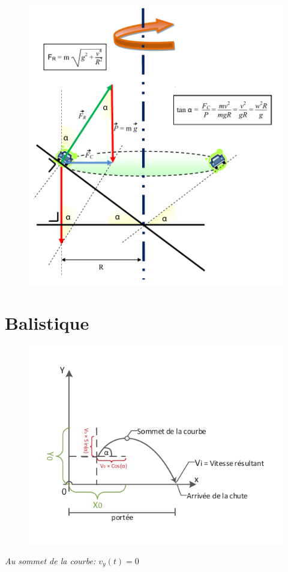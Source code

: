 \documentclass[12pt,a4paper]{article} %
\begin{document}
\begin{figure}[h]
	\centering
	\includegraphics{MCUA-Voiture}
\end{figure}

\newpage

\section{Balistique}

\begin{figure}[h]
	\centering
	\includegraphics{Balistique}
\end{figure}
\emph{Au sommet de la courbe: $v_y(t) = 0$}
\end{document}
